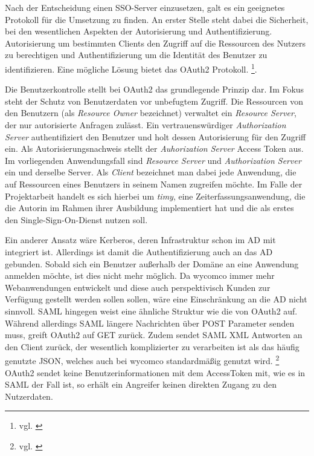 Nach der Entscheidung einen \ac{SSO}-Server einzusetzen, galt es ein geeignetes Protokoll für die Umsetzung zu finden. An erster Stelle steht dabei die Sicherheit, bei den wesentlichen Aspekten der Autorisierung und Authentifizierung. Autorisierung um bestimmten Clients den Zugriff auf die Ressourcen des Nutzers zu berechtigen und Authentifizierung um die Identität des Benutzer zu identifizieren. Eine mögliche Lösung bietet das OAuth2 Protokoll. \footnote{vgl. \cite{OAuth2}}.

Die Benutzerkontrolle stellt bei OAuth2 das grundlegende Prinzip dar. Im Fokus steht der Schutz von Benutzerdaten vor unbefugtem Zugriff. Die Ressourcen von den Benutzern (als \textit{Resource Owner} bezeichnet) verwaltet ein \textit{Resource Server}, der nur autorisierte Anfragen zulässt. Ein vertrauenswürdiger \textit{Authorization Server} authentifiziert den Benutzer und holt dessen Autorisierung für den Zugriff ein. Als Autorisierungsnachweis stellt der \textit{Auhorization Server} Access Token aus. Im vorliegenden Anwendungsfall sind \textit{Resource Server} und \textit{Authorization Server} ein und derselbe Server.
Als \textit{Client} bezeichnet man dabei jede Anwendung, die auf Ressourcen eines Benutzers in seinem Namen zugreifen möchte. Im Falle der Projektarbeit handelt es sich hierbei um \textit{timy}, eine Zeiterfassungsanwendung, die die Autorin im Rahmen ihrer Ausbildung implementiert hat und die als erstes den Single-Sign-On-Dienst nutzen soll. 

Ein anderer Ansatz wäre Kerberos, deren Infrastruktur schon im \ac{AD} mit integriert ist. Allerdings ist damit die Authentifizierung auch an das \ac{AD} gebunden. Sobald sich ein Benutzer außerhalb der Domäne an eine Anwendung anmelden möchte, ist dies nicht mehr möglich. Da wycomco immer mehr Webanwendungen entwickelt und diese auch perspektivisch Kunden zur Verfügung gestellt werden sollen sollen, wäre eine Einschränkung an die AD nicht sinnvoll. 
\acs{SAML} hingegen weist eine ähnliche Struktur wie die von OAuth2 auf. Während allerdings SAML längere Nachrichten über POST Parameter senden muss, greift OAuth2 auf GET zurück. Zudem sendet SAML \acs{XML} Antworten an den Client zurück, der wesentlich komplizierter zu verarbeiten ist als das häufig genutzte \acs{JSON}, welches auch bei wycomco standardmäßig genutzt wird. \footnote{vgl. \cite{SSO-Vgl}}
OAuth2 sendet keine Benutzerinformationen mit dem AccessToken mit, wie es in SAML der Fall ist, so erhält ein Angreifer keinen direkten Zugang zu den Nutzerdaten.


